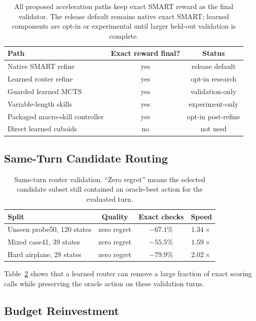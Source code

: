\documentclass[10pt,twocolumn,letterpaper]{article}
\begin{document}
\begin{table}[t]
\centering
\small
\begin{tabularx}{\linewidth}{lcc}
\toprule
Path & Exact reward final? & Status \\
\midrule
Native SMART refine & yes & release default \\
Learned router refine & yes & opt-in research \\
Guarded learned MCTS & yes & validation-only \\
Variable-length skills & yes & experiment-only \\
Packaged macro-skill controller & yes & opt-in post-refine \\
Direct learned cuboids & no & not used \\
\bottomrule
\end{tabularx}
\caption{All proposed acceleration paths keep exact SMART reward as the final
validator.  The release default remains native exact SMART; learned components
are opt-in or experimental until larger held-out validation is complete.}
\label{tab:status}
\end{table}

\subsection{Same-Turn Candidate Routing}

\begin{table}[t]
\centering
\small
\begin{tabularx}{\linewidth}{lccc}
\toprule
Split & Quality & Exact checks & Speed \\
\midrule
Unseen probe50, 120 states & zero regret & $-67.1\%$ & $1.34\times$ \\
Mixed case41, 39 states & zero regret & $-55.5\%$ & $1.59\times$ \\
Hard airplane, 28 states & zero regret & $-79.9\%$ & $2.02\times$ \\
\bottomrule
\end{tabularx}
\caption{Same-turn router validation.  ``Zero regret'' means the selected
candidate subset still contained an oracle-best action for the evaluated turn.}
\label{tab:router}
\end{table}

Table~\ref{tab:router} shows that a learned router can remove a large fraction
of exact scoring calls while preserving the oracle action on these validation
turns.

\subsection{Budget Reinvestment}
\end{document}
